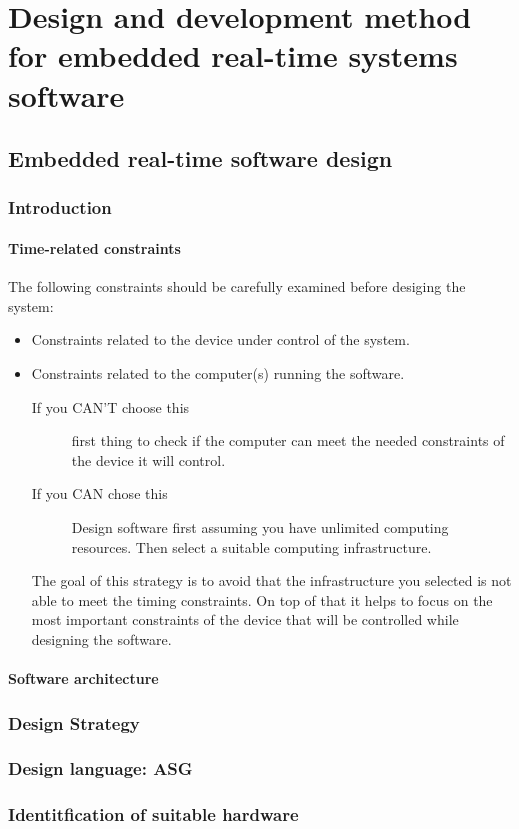 \documentclass[../main.tex]{subfiles}
\begin{document}
\chapter{Design and development method for embedded real-time systems software}

\section{Embedded real-time software design}
\subsection{Introduction}
\subsubsection{Time-related constraints}
The following constraints should be carefully examined before desiging the system: 
\begin{itemize}
	\item Constraints related to the device under control of the system. 
	\item Constraints related to the computer(s) running the software. 
		\begin{description}
			\item[If you CAN'T choose this] first thing to check if the computer can meet the needed constraints of the device it will control.
				\item[If you CAN  chose this] Design software first assuming you have unlimited computing resources. Then select a suitable computing infrastructure.
		\end{description} 
	The goal of this strategy is to avoid that the infrastructure you selected is not able to meet the timing constraints. On top of that it helps to focus on the most important constraints of the device that will be controlled while designing the software.
\end{itemize}

\subsubsection{Software architecture}
\subsection{Design Strategy}
\subsection{Design language: ASG}
\subsection{Identitfication of suitable hardware}
\end{document}
